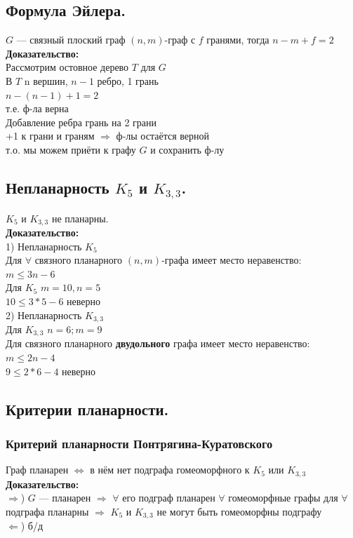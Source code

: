 \documentclass[12pt]{article}
\begin{document}
\subsection{Формула Эйлера.}
	$G$ — связный плоский граф $(n,m)$-граф с $f$ гранями, тогда $n - m + f = 2$\\
	\textbf{Доказательство:}\\
		Рассмотрим остовное дерево $T$ для $G$\\
		В $T$ n вершин, $n-1$ ребро, 1 грань\\
		$n - (n - 1) + 1 = 2$\\ т.е. ф-ла верна\\
		Добавление ребра грань на 2 грани\\
		+1 к грани и граням $\Rightarrow$ ф-лы остаётся верной\\
		т.о. мы можем приёти к графу $G$ и сохранить ф-лу\\
	\qedsymbol
\subsection{Непланарность $K_5$ и $K_{3,3}$.}
	$K_5$ и $K_{3,3}$ не планарны.\\
	\textbf{Доказательство:}\\
	1) Непланарность $K_5$\\
	Для $\forall$ связного планарного $(n,m)$-графа имеет место неравенство:\\
	$m \leqslant 3n - 6$\\
	Для $K_5$ $m = 10, n = 5$\\
	$10 \leqslant 3 * 5 - 6$ неверно\\
	2) Непланарность $K_{3,3}$\\
	Для  $K_{3,3}$ $n=6; m=9$\\
	Для связного планарного \textbf{двудольного} графа имеет место неравенство:\\
	$m \leqslant 2n - 4$\\
	$9 \leqslant 2*6 - 4$ неверно\\
	\qedsymbol
\subsection{Критерии планарности.}
\subsubsection{Критерий планарности Понтрягина-Куратовского}
	Граф планарен $\Leftrightarrow$ в нём нет подграфа гомеоморфного к $K_5$ или $K_{3,3}$\\
	\textbf{Доказательство:}\\
		$\Rightarrow$) $G$ — планарен $\Rightarrow$ $\forall$ его подграф планарен $\forall$ гомеоморфные графы для $\forall$ подграфа планарны $\Rightarrow$ $K_{5}$ и $K_{3,3}$ не могут быть гомеоморфны подграфу\\
		$\Leftarrow$) б/д\\
	\qedsymbol
\end{document}
